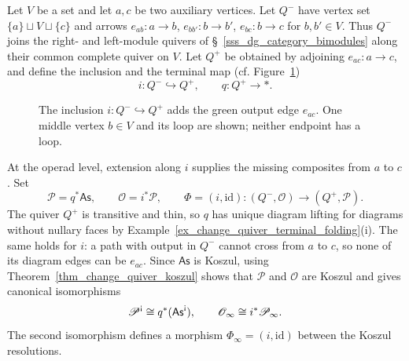 \documentclass[11pt,letterpaper]{article}
\numberwithin{equation}{section}
\theoremstyle{plain}
\theoremstyle{definition}
\theoremstyle{remark}
\newcommand{\antishriek}{%
	\mathord{\mathchoice
		{\rotatebox[origin=c]{180}{$\displaystyle !$}}
		{\rotatebox[origin=c]{180}{$\textstyle !$}}
		{\rotatebox[origin=c]{180}{$\scriptstyle !$}}
		{\rotatebox[origin=c]{180}{$\scriptscriptstyle !$}}}}
\begin{document}
Let $V$ be a set and let $a,c$ be two auxiliary vertices.
Let $Q^-$ have vertex set $\{a\}\sqcup V\sqcup\{c\}$ and arrows
$ e_{ab}:a\to b$, $e_{bb'}:b\to b'$, $e_{bc}:b\to c$ for
 $b,b'\in V$.
Thus $Q^-$ joins the right- and left-module quivers of
\S~\ref{sss_dg_category_bimodules} along their common complete
quiver on $V$. Let $Q^+$ be obtained by adjoining $e_{ac}:a\to c$,
and define the inclusion and the terminal map
(cf. Figure~\ref{fig:bar-tensor-quiver})
\[
 i:Q^-\hookrightarrow Q^+,
 \qquad q:Q^+\longrightarrow *.
\]

\begin{figure}[htbp]
\centering

\caption{The inclusion $i:Q^-\hookrightarrow Q^+$ adds the green
output edge $e_{ac}$. One middle vertex $b\in V$ and its loop
are shown; neither endpoint has a loop.}
\label{fig:bar-tensor-quiver}
\end{figure}

At the operad level, extension along $i$ supplies the missing
composites from $a$ to $c$. Set
\[
 \mathscr P=q^*\mathsf{As},\qquad
 \mathscr O=i^*\mathscr P,\qquad
 \Phi=(i,\mathrm{id}):(Q^-,\mathscr O)\longrightarrow(Q^+,\mathscr P).
\]
The quiver $Q^+$ is transitive and thin, so $q$ has unique diagram
lifting for diagrams without nullary faces by
Example~\ref{ex_change_quiver_terminal_folding}(i).
The same holds for $i$: a path with output in $Q^-$ cannot cross
from $a$ to $c$, so none of its diagram edges can be $e_{ac}$.
Since $\mathsf{As}$ is Koszul,
using Theorem~\ref{thm_change_quiver_koszul} shows that
$\mathscr P$ and $\mathscr O$ are Koszul and gives canonical
isomorphisms
\begin{equation}\label{eq_tensor_cooperad_pullback}
 \mathscr P^{\antishriek}
 \cong q^*(\mathsf{As}^{\antishriek}),\qquad
 \mathscr O_\infty\cong i^*\mathscr P_\infty.
\end{equation}
The second isomorphism defines a morphism
$\Phi_\infty=(i,\mathrm{id})$ between the Koszul resolutions.
\end{document}
